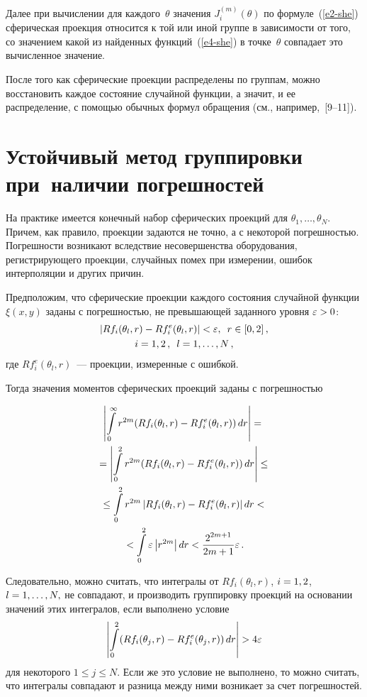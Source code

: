 \begin{multicols}{2}
Далее при вычислении для каждого~$\theta$ значения
$J^{(m)}_{i}(\theta)$ по формуле~(\ref{e2-she}) сферическая проекция относится
к той или иной группе в зависимости от того, со значением какой из
найденных функций~(\ref{e4-she}) в точке~$\theta$ совпадает это вычисленное значение.

После того как сферические проекции распределены по группам, можно восстановить
каждое состояние случайной функции, а значит, и ее распределение,
с помощью обычных формул обращения (см., например,~[9--11]).

\section{Устойчивый метод группировки при~наличии погрешностей}

На практике имеется конечный набор сферических проекций 
для $\theta_1,\ldots,\theta_N$. Причем, как правило, проекции
задаются не точно, а с некоторой погрешностью. Погрешности 
возникают вследствие несовершенства оборудования, регистрирующего
проекции, случайных помех при измерении, ошибок интерполяции и других причин.

Предположим, что сферические проекции каж\-до\-го состояния случайной функции 
$\xi(x,y)$ заданы с погрешностью, не превышающей заданного уровня $\eps\hm>0$:
\begin{multline*}
\left\vert Rf_{i}(\theta_l,r)-Rf^{e}_{i}(\theta_l,r)\right\vert<\varepsilon, \enskip
r\in[0,2]\,,\\
 i=1,2\,,\enskip  l=1,\ldots,N\,,
\end{multline*}
где $Rf^{e}_{i}(\theta_l,r)$~--- проекции, измеренные с ошибкой.

Тогда значения моментов сферических проекций заданы с погрешностью

\noindent
\begin{multline}
\left\vert\int\limits\limits^{\infty}_{0}r^{2m}(Rf_{i}(\theta_l,r)-
Rf^{e}_{i}(\theta_l,r))\,dr\right\vert={}\\
{}=\left\vert\int\limits\limits^{2}_{0}r^{2m}(Rf_{i}(\theta_l,r)-
Rf^{e}_{i}(\theta_l,r))\,dr\right\vert\leq{}\\
{}\leq\int\limits\limits^{2}_{0}r^{2m}\left\vert Rf_{i}(\theta_l,r)-Rf^{e}_{i}(\theta_l,r)\right\vert dr<{}\\
{}<
\int\limits\limits^{2}_{0}\varepsilon\left\vert r^{2m}\right\vert dr<\displaystyle\frac{\displaystyle 2^{2m+1}\mathstrut}{\displaystyle 2m+1\mathstrut}\varepsilon\,.\label{e5-she}
\end{multline}

Следовательно, можно считать, что интегралы от $Rf_{i}(\theta_l,r)$,
$i\hm=1,2$, $l\hm=1,\ldots,N,$ не совпадают,
и производить группировку проекций на основании значений этих интегралов, если выполнено условие
$$
\left\vert\int\limits\limits^{2}_{0}(Rf_{i}(\theta_j,r)-Rf^{e}_{i}(\theta_j,r))\,dr\right\vert>4\varepsilon
$$
для некоторого $1\leq j\leq N$. Если же это условие не выполнено, то можно 
считать, что интегралы совпадают и разница между ними
возникает за счет погрешностей.


\end{multicols}
